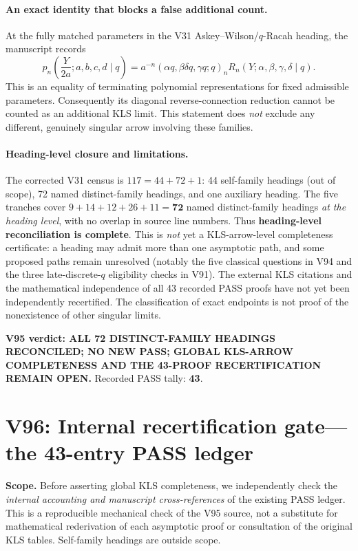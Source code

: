 \documentclass[11pt]{article}
\begin{document}
\paragraph{An exact identity that blocks a false additional count.}
At the fully matched parameters in the V31 Askey--Wilson/$q$-Racah heading, the manuscript records
\[
p_n\!\left(\frac{Y}{2a};a,b,c,d\mid q\right)
=a^{-n}(\alpha q,\beta\delta q,\gamma q;q)_n
R_n(Y;\alpha,\beta,\gamma,\delta\mid q).
\]
This is an equality of terminating polynomial representations for fixed admissible parameters. Consequently its diagonal reverse-connection reduction cannot be counted as an additional KLS limit. This statement does \emph{not} exclude any different, genuinely singular arrow involving these families.

\paragraph{Heading-level closure and limitations.}
The corrected V31 census is $117=44+72+1$: 44 self-family headings (out of scope), 72 named distinct-family headings, and one auxiliary heading. The five tranches cover $9+14+12+26+11=\mathbf{72}$ named distinct-family headings \emph{at the heading level}, with no overlap in source line numbers. Thus \textbf{heading-level reconciliation is complete}. This is \emph{not} yet a KLS-arrow-level completeness certificate: a heading may admit more than one asymptotic path, and some proposed paths remain unresolved (notably the five classical questions in V94 and the three late-discrete-$q$ eligibility checks in V91). The external KLS citations and the mathematical independence of all 43 recorded PASS proofs have not yet been independently recertified. The classification of exact endpoints is not proof of the nonexistence of other singular limits.

\noindent\textbf{V95 verdict: ALL 72 DISTINCT-FAMILY HEADINGS RECONCILED; NO NEW PASS; GLOBAL KLS-ARROW COMPLETENESS AND THE 43-PROOF RECERTIFICATION REMAIN OPEN.} Recorded PASS tally: \textbf{43}.


\section{V96: Internal recertification gate---the 43-entry PASS ledger}
\noindent\textbf{Scope.} Before asserting global KLS completeness, we independently check the \emph{internal accounting and manuscript cross-references} of the existing PASS ledger. This is a reproducible mechanical check of the V95 source, not a substitute for mathematical rederivation of each asymptotic proof or consultation of the original KLS tables. Self-family headings are outside scope.
\end{document}
